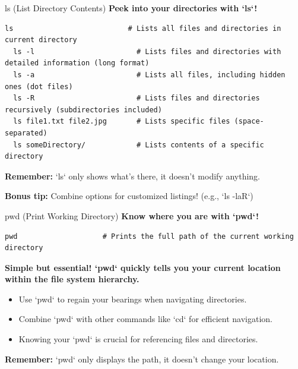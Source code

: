 \documentclass{beamer}
\begin{document}
\begin{frame}[fragile]{ls (List Directory Contents)}
  \textbf{Peek into your directories with `ls`!}

  \begin{lstlisting}[frame=none]
  ls                           # Lists all files and directories in current directory
  ls -l                        # Lists files and directories with detailed information (long format)
  ls -a                        # Lists all files, including hidden ones (dot files)
  ls -R                        # Lists files and directories recursively (subdirectories included)
  ls file1.txt file2.jpg       # Lists specific files (space-separated)
  ls someDirectory/            # Lists contents of a specific directory
  \end{lstlisting}

  \textbf{Remember:} `ls` only shows what's there, it doesn't modify anything.

  \textbf{Bonus tip:} Combine options for customized listings! (e.g., `ls -laR`)

\end{frame}

\begin{frame}[fragile]{pwd (Print Working Directory)}
  \textbf{Know where you are with `pwd`!}

  \begin{lstlisting}[frame=none]
  pwd                    # Prints the full path of the current working directory
  \end{lstlisting}

  \textbf{Simple but essential! `pwd` quickly tells you your current location within the file system hierarchy.}

  \begin{itemize}
    \item Use `pwd` to regain your bearings when navigating directories.
    \item Combine `pwd` with other commands like `cd` for efficient navigation.
    \item Knowing your `pwd` is crucial for referencing files and directories.
  \end{itemize}

  \textbf{Remember:} `pwd` only displays the path, it doesn't change your location.

\end{frame}
\end{document}
